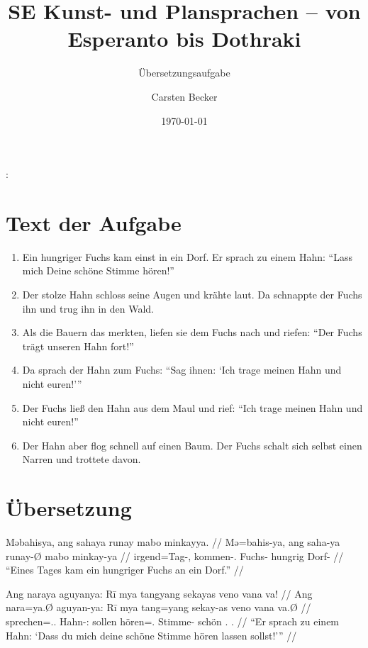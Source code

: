 \documentclass[12pt,paper=a4]{scrartcl}
\author{Carsten Becker}
\title{SE Kunst- und Plansprachen -- von Esperanto bis Dothraki}
\subtitle{Übersetzungsaufgabe}
\date{\today} %
\newcommand{\TsgM}{{\Tsg}.{\M}}
\newenvironment{mytitle}{
    \hfill
    \begin{minipage}{0.667\textwidth}
	\vspace{\baselineskip}
	\begin{center}
	    \Large
	    \sffamily\bfseries
	    \makeatletter
}{
	    \makeatother
	\end{center}
	\vspace{1em}
    \end{minipage}
    \hfill
}
\begin{document}

\begin{mytitle}
    \@title: \@subtitle\footnotemark
\end{mytitle}

\section{Text der Aufgabe}
\begin{enumerate}[noitemsep]
\item Ein hungriger Fuchs kam einst in ein Dorf. Er sprach zu einem Hahn: \enquote{Lass mich Deine schöne Stimme hören!}
\item Der stolze Hahn schloss seine Augen und krähte laut. Da schnappte der Fuchs ihn und trug ihn in den Wald.
\item Als die Bauern das merkten, liefen sie dem Fuchs nach und riefen: \enquote{Der Fuchs trägt unseren Hahn fort!}
\item Da sprach der Hahn zum Fuchs: \enquote{Sag ihnen: \enquote{Ich trage meinen Hahn und nicht euren!}}
\item Der Fuchs ließ den Hahn aus dem Maul und rief: \enquote{Ich trage meinen Hahn und nicht euren!}
\item Der Hahn aber flog schnell auf einen Baum. Der Fuchs schalt sich selbst einen Narren und trottete davon.
\end{enumerate}

\section{Übersetzung}

\pex %
\a\begingl
	\gla Məbahisya, ang sahaya runay mabo minkayya. //
	\glb Mə=bahis-ya, ang saha-ya runay-Ø mabo minkay-ya //
	\glc irgend=Tag-\Loc{}, \AgtT{} kommen-\TsgM{} Fuchs-\Top{} hungrig Dorf-\Loc{} //
	\glft \enquote{Eines Tages kam ein hungriger Fuchs an ein Dorf.} //
\endgl

\a\begingl
	\gla Ang naraya aguyanya: Rī mya tangyang sekayas veno vana va! //
	\glb Ang nara=ya.Ø aguyan-ya: Rī mya tang=yang sekay-as veno vana va.Ø //
	\glc \AgtT{} sprechen=\TsgM{}.\Top{} Hahn-\Loc{}: \CauT{} sollen hören=\Fsg{}.\Aarg{} Stimme-\Parg{} schön \Ssg{}.\Gen{} \Ssg{}.\Top{} //
	\glft \enquote{Er sprach zu einem Hahn: \enquote{Dass du mich deine schöne Stimme hören lassen sollst!}} //
\endgl
\end{document}
